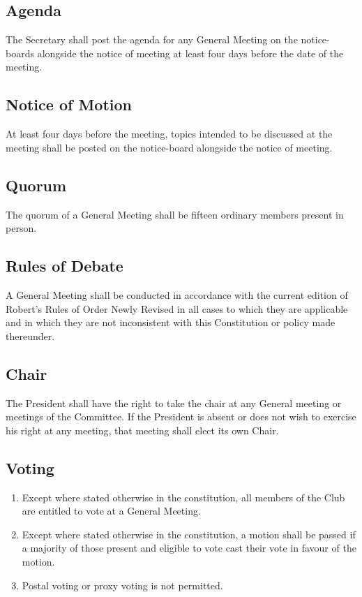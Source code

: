 \documentclass[11pt]{article} %
\begin{document}
\subsection{Agenda}
The Secretary shall post the agenda for any General Meeting on the notice-boards alongside the notice of meeting at least four days before the date of the meeting.

\subsection{Notice of Motion}
At least four days before the meeting, topics intended to be discussed at the meeting shall be posted on the notice-board alongside the notice of meeting.

\subsection{Quorum}
The quorum of a General Meeting shall be fifteen ordinary members present in person.

\subsection{Rules of Debate}
A General Meeting shall be conducted in accordance with the current edition of Robert’s Rules of Order Newly Revised in all cases to which they are applicable and in which they are not inconsistent with this Constitution or policy made thereunder.

\subsection{Chair}
The President shall have the right to take the chair at any General meeting or meetings of the Committee. If the President is absent or does not wish to exercise his right at any meeting, that meeting shall elect its own Chair.

\subsection{Voting}
\begin{enumerate}
	\item Except where stated otherwise in the constitution, all members of the Club are entitled to vote at a General Meeting.
	\item Except where stated otherwise in the constitution, a motion shall be passed if a majority of those present and eligible to vote cast their vote in favour of the motion.
	\item Postal voting or proxy voting is not permitted.
\end{enumerate}
\end{document}

